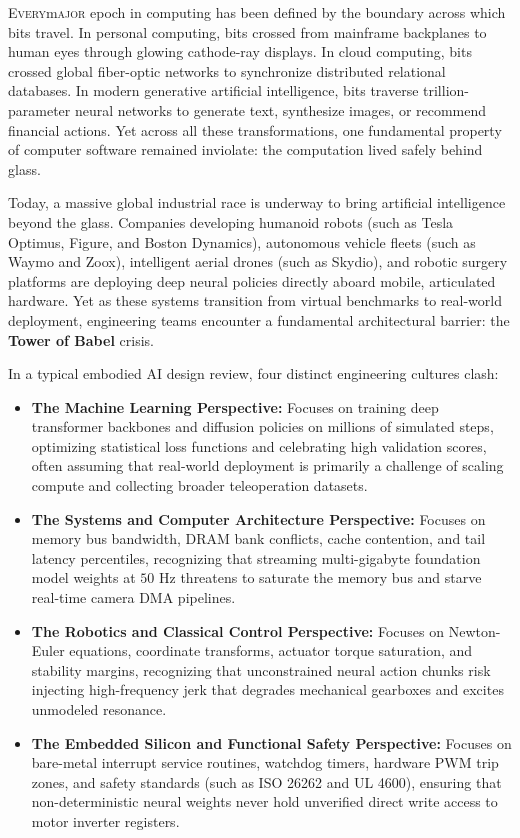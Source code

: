 \documentclass[
  10pt,
  letterpaper,
  twoside,
  openright,
  numbers=noenddot,
  headings=standardclasses
]{scrbook}
\begin{document}
\lettrine{E}{very}\lettrine{m}{ajor} epoch in computing has been defined
by the boundary across which bits travel. In personal computing, bits
crossed from mainframe backplanes to human eyes through glowing
cathode-ray displays. In cloud computing, bits crossed global
fiber-optic networks to synchronize distributed relational databases. In
modern generative artificial intelligence, bits traverse
trillion-parameter neural networks to generate text, synthesize images,
or recommend financial actions. Yet across all these transformations,
one fundamental property of computer software remained inviolate: the
computation lived safely behind glass.

Today, a massive global industrial race is underway to bring artificial
intelligence beyond the glass. Companies developing humanoid robots
(such as Tesla Optimus, Figure, and Boston Dynamics), autonomous vehicle
fleets (such as Waymo and Zoox), intelligent aerial drones (such as
Skydio), and robotic surgery platforms are deploying deep neural
policies directly aboard mobile, articulated hardware. Yet as these
systems transition from virtual benchmarks to real-world deployment,
engineering teams encounter a fundamental architectural barrier: the
\textbf{Tower of Babel} crisis.

In a typical embodied AI design review, four distinct engineering
cultures clash:

\begin{itemize}
\tightlist
\item
  \textbf{The Machine Learning Perspective:} Focuses on training deep
  transformer backbones and diffusion policies on millions of simulated
  steps, optimizing statistical loss functions and celebrating high
  validation scores, often assuming that real-world deployment is
  primarily a challenge of scaling compute and collecting broader
  teleoperation datasets.
\item
  \textbf{The Systems and Computer Architecture Perspective:} Focuses on
  memory bus bandwidth, DRAM bank conflicts, cache contention, and tail
  latency percentiles, recognizing that streaming multi-gigabyte
  foundation model weights at \(50\text{ Hz}\) threatens to saturate the
  memory bus and starve real-time camera DMA pipelines.
\item
  \textbf{The Robotics and Classical Control Perspective:} Focuses on
  Newton-Euler equations, coordinate transforms, actuator torque
  saturation, and stability margins, recognizing that unconstrained
  neural action chunks risk injecting high-frequency jerk that degrades
  mechanical gearboxes and excites unmodeled resonance.
\item
  \textbf{The Embedded Silicon and Functional Safety Perspective:}
  Focuses on bare-metal interrupt service routines, watchdog timers,
  hardware PWM trip zones, and safety standards (such as ISO 26262 and
  UL 4600), ensuring that non-deterministic neural weights never hold
  unverified direct write access to motor inverter registers.
\end{itemize}
\end{document}
